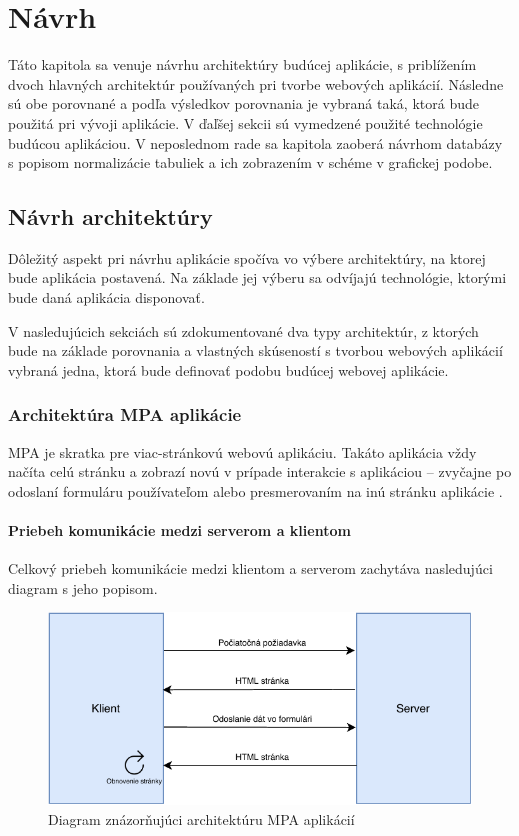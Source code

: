 \chapter{Návrh}
Táto kapitola sa venuje návrhu architektúry budúcej aplikácie, s priblížením dvoch hlavných architektúr používaných pri tvorbe webových aplikácií. Následne sú obe porovnané a podľa výsledkov porovnania je vybraná taká, ktorá bude použitá pri vývoji aplikácie. V ďaľšej sekcii sú vymedzené použité technológie budúcou aplikáciou. V neposlednom rade sa kapitola zaoberá návrhom databázy s popisom normalizácie tabuliek a ich zobrazením v schéme v grafickej podobe.

\section{Návrh architektúry}
Dôležitý aspekt pri návrhu aplikácie spočíva vo výbere architektúry, na ktorej bude aplikácia postavená. Na základe jej výberu sa odvíjajú technológie, ktorými bude daná aplikácia disponovať.

V nasledujúcich sekciách sú zdokumentované dva typy architektúr, z ktorých bude na základe porovnania a vlastných skúseností s tvorbou webových aplikácií vybraná jedna, ktorá bude definovať podobu budúcej webovej aplikácie.

\subsection{Architektúra MPA aplikácie}
MPA je skratka pre viac-stránkovú webovú aplikáciu. Takáto aplikácia vždy načíta celú stránku a zobrazí novú v prípade  interakcie s aplikáciou -- zvyčajne po odoslaní formuláru používateľom alebo presmerovaním na inú stránku aplikácie \cite{spa-vs-mpa-1}.

\subsubsection*{Priebeh komunikácie medzi serverom a klientom}
Celkový priebeh komunikácie medzi klientom a serverom zachytáva nasledujúci diagram s jeho popisom.

\begin{figure}[H]
	\includegraphics[width=1.0\textwidth]{media/navrh/MPA.pdf}
	\caption{Diagram znázorňujúci architektúru MPA aplikácií}\label{mpa-graf}
\end{figure}

